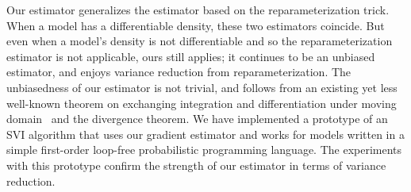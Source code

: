 Our estimator generalizes the estimator based on the reparameterization trick. When a model has a differentiable density, these two estimators coincide. But even when a model's density is not differentiable and so the reparameterization estimator is not applicable, ours still applies; it continues to be an unbiased estimator, and enjoys variance reduction from reparameterization. The unbiasedness of our estimator is not trivial, and follows from an existing yet less well-known theorem on exchanging integration and differentiation under moving domain~\cite{FlandersAMM1973} and the divergence theorem. We have implemented a prototype of an SVI algorithm that uses our gradient estimator and works for models written in a simple first-order loop-free probabilistic programming language. The experiments with this prototype confirm the strength of our estimator in terms of variance reduction.


